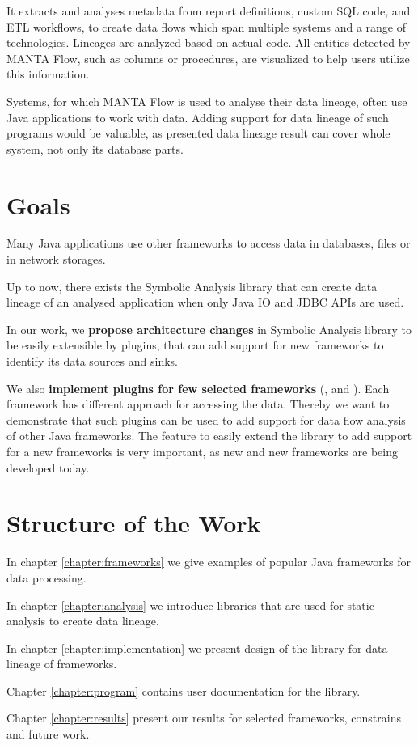 It extracts and analyses metadata from report definitions,
custom SQL code, and ETL workflows, to create data flows
which span multiple systems and a range of technologies.
Lineages are analyzed based on actual code.
All entities detected by MANTA Flow, such as columns or procedures,
are visualized to help users utilize this information.

Systems, for which MANTA Flow is used to analyse their data lineage,
often use Java applications to work with data. Adding support
for data lineage of such programs would be valuable,
as presented data lineage result can cover whole system,
not only its database parts.




\section{Goals}

Many Java applications use other frameworks to access data
in databases, files or in network storages.

Up to now, there exists the Symbolic Analysis library
that can create data lineage of an analysed application
when only Java IO and JDBC APIs are used.

In our work, we \textbf{propose architecture changes} in Symbolic Analysis library
to be easily extensible by plugins, that can add support for new frameworks
to identify its data sources and sinks.

We also \textbf{implement plugins for few selected frameworks}
(\citet{MyBatis}, \citet{SpringJDBC} and \citet{Kafka}).
Each framework has different approach for accessing the data.
Thereby we want to demonstrate that such plugins can be used to
add support for data flow analysis of other Java frameworks.
The feature to easily extend the library to add support for a new frameworks
is very important, as new and new frameworks are being developed today.




\section{Structure of the Work}

In chapter \ref{chapter:frameworks} we give examples of popular Java frameworks
for data processing.

In chapter \ref{chapter:analysis} we introduce libraries that are used
for static analysis to create data lineage.

In chapter \ref{chapter:implementation} we present design of the library for
data lineage of frameworks.

Chapter \ref{chapter:program} contains user documentation for the library.

Chapter \ref{chapter:results} present our results for selected frameworks,
constrains and future work.



